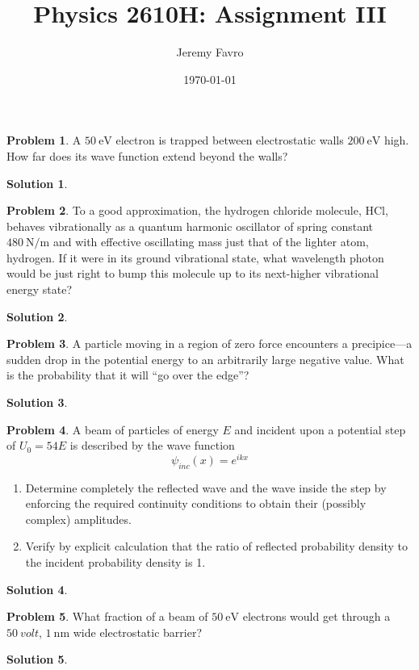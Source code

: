\documentclass[10pt]{article}
\title{Physics 2610H: Assignment III}
\author{Jeremy Favro}
\date{\today}
\theoremstyle{definition}
\newtheorem{problem}{Problem}
\newtheorem{soln}{Solution}
\begin{document}
\maketitle

\begin{problem}
A $\qty{50}{\electronvolt}$ electron is trapped between electrostatic walls $\qty{200}{\electronvolt}$ high.
How far does its wave function extend beyond the walls?
\end{problem}
\begin{soln}

\end{soln}

\begin{problem}
To a good approximation, the hydrogen chloride molecule, HCl, behaves vibrationally as a quantum harmonic
oscillator of spring constant $\qty{480}{\newton\per\meter}$ and with effective oscillating mass just that of the lighter atom, hydrogen.
If it were in its ground vibrational state, what wavelength photon would be just right to bump this molecule up to its next-higher vibrational energy state?
\end{problem}
\begin{soln}

\end{soln}

\begin{problem}
A particle moving in a region of zero force encounters a precipice---a sudden drop in the potential energy to an arbitrarily large negative value.
What is the probability that it will “go over the edge”?
\end{problem}
\begin{soln}

\end{soln}

\begin{problem}
A beam of particles of energy $E$ and incident upon a potential step of $U_0 = 54E$ is described by the wave function
$$\psi_{inc}(x)=e^{ikx}$$
\begin{enumerate}[label=(\alph*)]
  \item Determine completely the reflected wave and the
        wave inside the step by enforcing the required
        continuity conditions to obtain their (possibly
        complex) amplitudes.
  \item Verify by explicit calculation that the ratio of
        reflected probability density to the incident probability density is 1.
\end{enumerate}
\end{problem}
\begin{soln}

\end{soln}

\begin{problem}
What fraction of a beam of $\qty{50}{\electronvolt}$ electrons would get through a $\qty{50}{volt}$, $\qty{1}{\nano\meter}$ wide electrostatic barrier?
\end{problem}
\begin{soln}

\end{soln}
\end{document}
